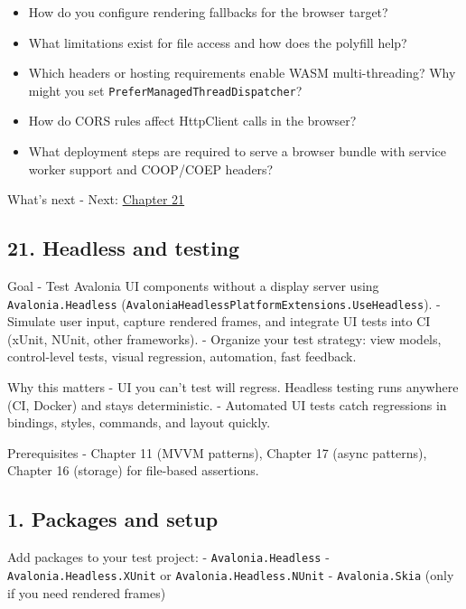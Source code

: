 \begin{itemize}
\tightlist
\item
  How do you configure rendering fallbacks for the browser target?
\item
  What limitations exist for file access and how does the polyfill help?
\item
  Which headers or hosting requirements enable WASM multi-threading? Why
  might you set \passthrough{\lstinline!PreferManagedThreadDispatcher!}?
\item
  How do CORS rules affect HttpClient calls in the browser?
\item
  What deployment steps are required to serve a browser bundle with
  service worker support and COOP/COEP headers?
\end{itemize}

What's next - Next: \href{Chapter21.md}{Chapter 21}

\newpage

\subsection{21. Headless and testing}\label{headless-and-testing}

Goal - Test Avalonia UI components without a display server using
\passthrough{\lstinline!Avalonia.Headless!}
(\passthrough{\lstinline!AvaloniaHeadlessPlatformExtensions.UseHeadless!}).
- Simulate user input, capture rendered frames, and integrate UI tests
into CI (xUnit, NUnit, other frameworks). - Organize your test strategy:
view models, control-level tests, visual regression, automation, fast
feedback.

Why this matters - UI you can't test will regress. Headless testing runs
anywhere (CI, Docker) and stays deterministic. - Automated UI tests
catch regressions in bindings, styles, commands, and layout quickly.

Prerequisites - Chapter 11 (MVVM patterns), Chapter 17 (async patterns),
Chapter 16 (storage) for file-based assertions.

\subsection{1. Packages and setup}\label{packages-and-setup}

Add packages to your test project: -
\passthrough{\lstinline!Avalonia.Headless!} -
\passthrough{\lstinline!Avalonia.Headless.XUnit!} or
\passthrough{\lstinline!Avalonia.Headless.NUnit!} -
\passthrough{\lstinline!Avalonia.Skia!} (only if you need rendered
frames)

